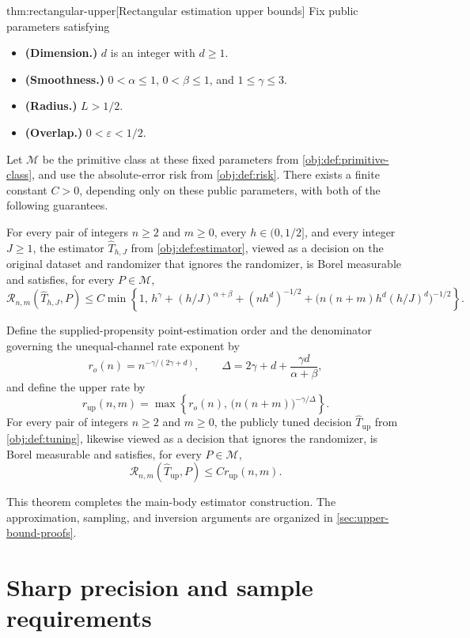 \documentclass[11pt]{article}
\begin{document}
\begin{theoremv}{thm:rectangular-upper}[Rectangular estimation upper bounds]
Fix public parameters satisfying
\begin{itemize}
\item \textbf{(Dimension.)} \(d\) is an integer with \(d\ge1\).
\item \textbf{(Smoothness.)} \(0<\alpha\le1\), \(0<\beta\le1\), and \(1\le\gamma\le3\).
\item \textbf{(Radius.)} \(L>1/2\).
\item \textbf{(Overlap.)} \(0<\varepsilon<1/2\).
\end{itemize}
Let \(\mathcal M\) be the primitive class at these fixed parameters from \cref{obj:def:primitive-class}, and use the absolute-error risk from \cref{obj:def:risk}. There exists a finite constant \(C>0\), depending only on these public parameters, with both of the following guarantees.

For every pair of integers \(n\ge2\) and \(m\ge0\), every \(h\in(0,1/2]\), and every integer \(J\ge1\), the estimator \(\widehat T_{h,J}\) from \cref{obj:def:estimator}, viewed as a decision on the original dataset and randomizer that ignores the randomizer, is Borel measurable and satisfies, for every \(P\in\mathcal M\),
\[
\mathcal R_{n,m}(\widehat T_{h,J},P)
\le
C\min\left\{
1,\,
h^\gamma+
(h/J)^{\alpha+\beta}+
(nh^d)^{-1/2}+
\bigl(n(n+m)h^d(h/J)^d\bigr)^{-1/2}
\right\}.
\]

Define the supplied-propensity point-estimation order and the denominator governing the unequal-channel rate exponent by
\[
r_o(n)=n^{-\gamma/(2\gamma+d)},
\qquad
\Delta=2\gamma+d+\frac{\gamma d}{\alpha+\beta},
\]
and define the upper rate by
\[
r_{\mathrm{up}}(n,m)
=
\max\left\{
r_o(n),\,
\bigl(n(n+m)\bigr)^{-\gamma/\Delta}
\right\}.
\]
For every pair of integers \(n\ge2\) and \(m\ge0\), the publicly tuned decision \(\widehat T_{\mathrm{up}}\) from \cref{obj:def:tuning}, likewise viewed as a decision that ignores the randomizer, is Borel measurable and satisfies, for every \(P\in\mathcal M\),
\[
\mathcal R_{n,m}(\widehat T_{\mathrm{up}},P)
\le C r_{\mathrm{up}}(n,m).
\]
\end{theoremv}

This theorem completes the main-body estimator construction. The approximation, sampling, and inversion arguments are organized in \cref{sec:upper-bound-proofs}.


\section{Sharp precision and sample requirements}\label{sec:sharp-precision}
\end{document}
